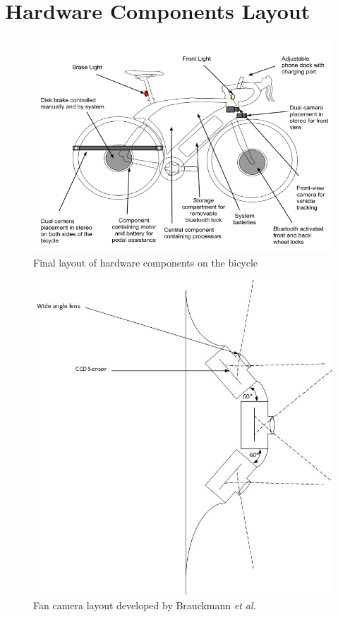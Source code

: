 \documentclass[a4paper]{report}
\begin{document}
{\section{Hardware Components Layout}
\begin{figure}[H]
\centering
\includegraphics[scale=0.6]{figures/final_design/BicycleDrawing}
\caption{Final layout of hardware components on the bicycle}
\label{fig:final_layout}
\end{figure}

\begin{figure}[H]
\centering
\includegraphics[scale=0.6]{figures/fan_camera}
\caption{Fan camera layout developed by Brauckmann \textit{et al.} \citep{towards_all_around_sensing}}
\label{fig:fan_camera}
\end{figure}

}
\end{document}
